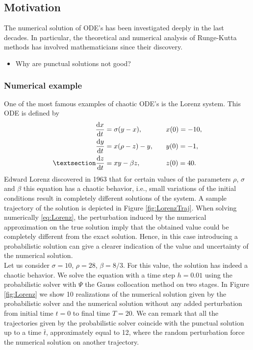 \subsection{Motivation}

The numerical solution of ODE's has been investigated deeply in the last decades. In particular, the theoretical and numerical analysis of Runge-Kutta methods has involved mathematicians since their discovery.
\begin{itemize}
	\item Why are punctual solutions not good?
\end{itemize}

\subsubsection{Numerical example}

One of the most famous examples of chaotic ODE's is the Lorenz system. This ODE is defined by
\begin{equation}\label{eq:Lorenz}
\begin{aligned}
\dv{x}{t} &= \sigma(y - x), \quad &&x(0) = -10,\\
\dv{y}{t} &= x(\rho - z) - y, \quad &&y(0) = -1,\\§
\dv{z}{t} &= xy - \beta z, \quad &&z(0) = 40.
\end{aligned}
\end{equation}
Edward Lorenz discovered in 1963 that for certain values of the parameters $\rho$, $\sigma$ and $\beta$ this equation has a chaotic behavior, i.e., small variations of the initial conditions result in completely different solutions of the system. A sample trajectory of the solution is depicted in Figure \ref{fig:LorenzTraj}. When solving numerically \eqref{eq:Lorenz}, the perturbation induced by the numerical approximation on the true solution imply that the obtained value could be completely different from the exact solution. Hence, in this case introducing a probabilistic solution can give a clearer indication of the value and uncertainty of the numerical solution. \\
Let us consider $\sigma = 10$, $\rho = 28$, $\beta = 8/3$. For this value, the solution has indeed a chaotic behavior. We solve the equation with a time step $h = 0.01$ using the probabilistic solver with $\Psi$ the Gauss collocation method on two stages. In Figure \ref{fig:Lorenz} we show 10 realizations of the numerical solution given by the probabilistic solver and the numerical solution without any added perturbation from initial time $t = 0$ to final time $T = 20$. We can remark that all the trajectories given by the probabilistic solver coincide with the punctual solution up to a time $\bar t$, approximately equal to 12, where the random perturbation force the numerical solution on another trajectory. 

